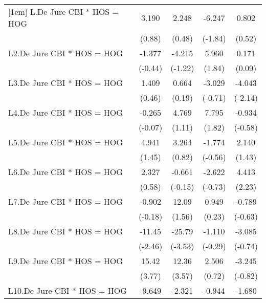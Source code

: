 {\begin{longtable}{l*{4}{c}}
[1em]
L.De Jure CBI * HOS = HOG&    3.190         &    2.248         &   -6.247         &    0.802         \\
                &   (0.88)         &   (0.48)         &  (-1.84)         &   (0.52)         \\
[1em]
L2.De Jure CBI * HOS = HOG&   -1.377         &   -4.215         &    5.960         &    0.171         \\
                &  (-0.44)         &  (-1.22)         &   (1.84)         &   (0.09)         \\
[1em]
L3.De Jure CBI * HOS = HOG&    1.409         &    0.664         &   -3.029         &   -4.043\sym{*}  \\
                &   (0.46)         &   (0.19)         &  (-0.71)         &  (-2.14)         \\
[1em]
L4.De Jure CBI * HOS = HOG&   -0.265         &    4.769         &    7.795         &   -0.934         \\
                &  (-0.07)         &   (1.11)         &   (1.82)         &  (-0.58)         \\
[1em]
L5.De Jure CBI * HOS = HOG&    4.941         &    3.264         &   -1.774         &    2.140         \\
                &   (1.45)         &   (0.82)         &  (-0.56)         &   (1.43)         \\
[1em]
L6.De Jure CBI * HOS = HOG&    2.327         &   -0.661         &   -2.622         &    4.413\sym{*}  \\
                &   (0.58)         &  (-0.15)         &  (-0.73)         &   (2.23)         \\
[1em]
L7.De Jure CBI * HOS = HOG&   -0.902         &    12.09         &    0.949         &   -0.789         \\
                &  (-0.18)         &   (1.56)         &   (0.23)         &  (-0.63)         \\
[1em]
L8.De Jure CBI * HOS = HOG&   -11.45\sym{*}  &   -25.79\sym{***}&   -1.110         &   -3.085         \\
                &  (-2.46)         &  (-3.53)         &  (-0.29)         &  (-0.74)         \\
[1em]
L9.De Jure CBI * HOS = HOG&    15.42\sym{***}&    12.36\sym{***}&    2.506         &   -3.245         \\
                &   (3.77)         &   (3.57)         &   (0.72)         &  (-0.82)         \\
[1em]
L10.De Jure CBI * HOS = HOG&   -9.649\sym{***}&   -2.321         &   -0.944         &   -1.680         \\

\end{longtable}}

